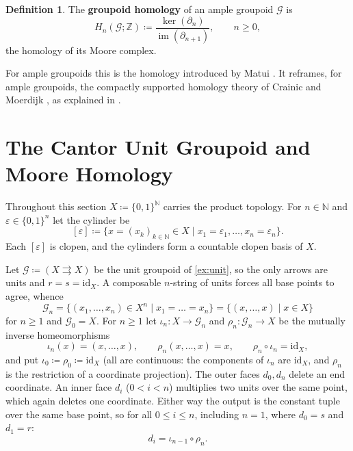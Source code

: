 \documentclass{extracta-temp-26}
\numberwithin{equation}{section}
\theoremstyle{definition}
\newtheorem{defi}[teo]{Definition}
\theoremstyle{remark}
\newcommand{\G}{\mathcal{G}}
\newcommand{\Z}{\mathbb{Z}}
\newcommand{\N}{\mathbb{N}}
\newcommand{\id}{\mathrm{id}}
\DeclareMathOperator{\im}{im}
\newcommand{\term}[1]{\textbf{#1}}
\begin{document}
\begin{defi}\label{def:homology}
The \term{groupoid homology} of an ample groupoid \(\G\) is
\begin{equation}\label{eq:homology}
H_n(\G;\Z)\coloneqq\frac{\ker(\partial_n)}{\im(\partial_{n+1})},
\qquad n\ge 0,
\end{equation}
the homology of its Moore complex.
\end{defi}

For ample groupoids this is the homology introduced by Matui \cite[Definition~3.1]{matui2012homology}.
It reframes, for ample groupoids, the compactly supported homology theory of Crainic and Moerdijk \cite[Section~3]{crainic2000homology}, as explained in \cite[Section~4]{farsi2019ample}.

\section{The Cantor Unit Groupoid and Moore Homology}\label{sec:moore}
Throughout this section \(X\coloneqq\{0,1\}^\N\) carries the product topology.
For \(n\in\N\) and \(\varepsilon\in\{0,1\}^n\) let the cylinder be
\begin{equation}\label{eq:cylinder}
[\varepsilon]\coloneqq\{x=(x_k)_{k\in\N}\in X\mid x_1=\varepsilon_1,\dots,x_n=\varepsilon_n\}.
\end{equation}
Each \([\varepsilon]\) is clopen, and the cylinders form a countable clopen basis of \(X\).

Let \(\G\coloneqq(X\rightrightarrows X)\) be the unit groupoid of \cref{ex:unit}, so the only arrows are units and \(r=s=\id_X\).
A composable \(n\)-string of units forces all base points to agree, whence
\begin{equation}\label{eq:unit-nerve}
\G_n=\{(x_1,\dots,x_n)\in X^n\mid x_1=\dots=x_n\}=\{(x,\dots,x)\mid x\in X\}
\end{equation}
for \(n\ge 1\) and \(\G_0=X\).
For \(n\ge 1\) let \(\iota_n\colon X\to\G_n\) and \(\rho_n\colon\G_n\to X\) be the mutually inverse homeomorphisms
\begin{equation}\label{eq:iota-rho}
\iota_n(x)=(x,\dots,x),\qquad
\rho_n(x,\dots,x)=x,\qquad
\rho_n\circ\iota_n=\id_X,
\end{equation}
and put \(\iota_0\coloneqq\rho_0\coloneqq\id_X\) (all are continuous: the components of \(\iota_n\) are \(\id_X\), and \(\rho_n\) is the restriction of a coordinate projection).
The outer faces \(d_0,d_n\) delete an end coordinate.
An inner face \(d_i\) (\(0<i<n\)) multiplies two units over the same point, which again deletes one coordinate.
Either way the output is the constant tuple over the same base point, so for all \(0\le i\le n\), including \(n=1\), where \(d_0=s\) and \(d_1=r\):
\begin{equation}\label{eq:unit-faces}
d_i=\iota_{n-1}\circ\rho_n.
\end{equation}
\end{document}
